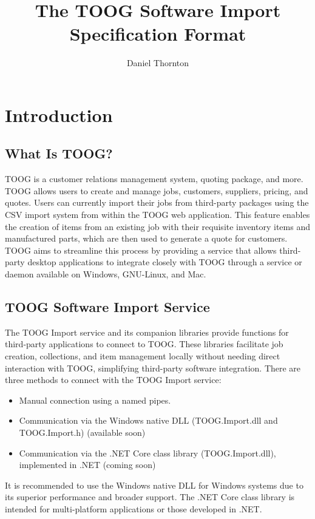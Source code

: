 \documentclass{memoir}
\begin{document}
	
	\title{The TOOG Software Import Specification Format}
	\maketitle
	\tableofcontents
	\pagebreak
	\author{Daniel Thornton}
	\section{Introduction}
	
	\subsection{What Is TOOG?}
	TOOG is a customer relations management system, quoting package, and more. TOOG allows users to create and manage jobs, customers, suppliers, pricing, and quotes. Users can currently import their jobs from third-party packages using the CSV import system from within the TOOG web application. This feature enables the creation of items from an existing job with their requisite inventory items and manufactured parts, which are then used to generate a quote for customers. TOOG aims to streamline this process by providing a service that allows third-party desktop applications to integrate closely with TOOG through a service or daemon available on Windows, GNU-Linux, and Mac.
	
	\subsection{TOOG Software Import Service}
	The TOOG Import service and its companion libraries provide functions for third-party applications to connect to TOOG. These libraries facilitate job creation, collections, and item management locally without needing direct interaction with TOOG, simplifying third-party software integration. There are three methods to connect with the TOOG Import service:
	
	\begin{itemize}
		\item Manual connection using a named pipes.
		\item Communication via the Windows native DLL (TOOG.Import.dll and TOOG.Import.h) (available soon)
		\item Communication via the .NET Core class library (TOOG.Import.dll), implemented in .NET (coming soon)
	\end{itemize}
	
	It is recommended to use the Windows native DLL for Windows systems due to its superior performance and broader support. The .NET Core class library is intended for multi-platform applications or those developed in .NET.
	
\end{document}
